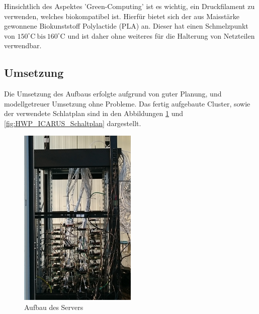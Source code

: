 Hinsichtlich des Aspektes 'Green-Computing' ist es wichtig, ein Druckfilament zu verwenden, 
welches biokompatibel ist. Hierfür bietet sich der aus Maisstärke gewonnene Biokunststoff Polylactide (PLA) an.
Dieser hat einen Schmelzpunkt von $150^\circ\text{C}~\text{bis}~160^\circ \text{C}$
und ist daher ohne weiteres für die Halterung von Netzteilen verwendbar.



\subsection{Umsetzung}
Die Umsetzung des Aufbaus erfolgte aufgrund von guter Planung,
und modellgetreuer Umsetzung ohne Probleme.
Das fertig aufgebaute Cluster, sowie der verwendete Schlatplan 
sind in den Abbildungen \ref{fig:HWP_ICARUS_Server}
und \ref{fig:HWP_ICARUS_Schaltplan} dargestellt.~\\
\begin{minipage}{0.45\textwidth}
\begin{figure}[H]
  \centering
    \includegraphics[width=0.5\textwidth]{./Bilder/Server-Aufbau/DSC_0020-small.JPG}
\caption{Aufbau des Servers}
    \label{fig:HWP_ICARUS_Server}
\end{figure} 
\end{minipage}
\hfill
